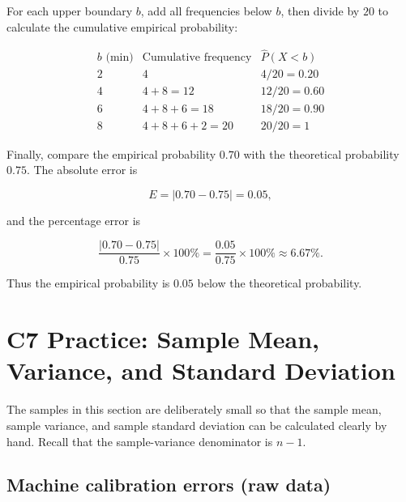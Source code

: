 For each upper boundary $b$, add all frequencies below $b$, then divide
by $20$ to calculate the cumulative empirical probability:

\[
\begin{array}{c|c|c}
    b\text{ (min)} & \text{Cumulative frequency} & \widehat P(X<b) \\ \hline
    2 & 4 & 4/20=0.20 \\
    4 & 4+8=12 & 12/20=0.60 \\
    6 & 4+8+6=18 & 18/20=0.90 \\
    8 & 4+8+6+2=20 & 20/20=1
\end{array}
\]

Finally, compare the empirical probability $0.70$ with the theoretical
probability $0.75$. The absolute error is

\[
E=|0.70-0.75|=0.05,
\]

and the percentage error is

\[
\frac{|0.70-0.75|}{0.75}\times100\%
=\frac{0.05}{0.75}\times100\%\approx6.67\%.
\]

Thus the empirical probability is $0.05$ below the theoretical probability.


\section{C7 Practice: Sample Mean, Variance, and Standard Deviation}
\label{sec:c7-only-practice}

\vspace{5mm}

The samples in this section are deliberately small so that the sample mean,
sample variance, and sample standard deviation can be calculated clearly by
hand. Recall that the sample-variance denominator is $n-1$.

\subsection{Machine calibration errors (raw data)}
\label{sec:c7-only-raw}

